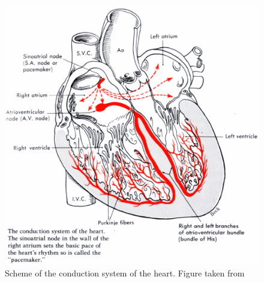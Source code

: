 \vspace{-0.5cm}
\begin{figure}[H]
\begin{center}
\includegraphics[scale=0.23]{./teile/introduction/conduction_system.png}
\caption{Scheme of the conduction system of the heart. Figure taken from \cite{amc}}
\label{condsys}
\end{center}
\end{figure}

\newpage

